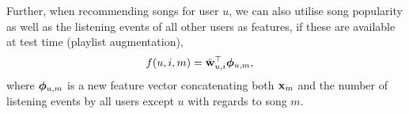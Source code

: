 Further, when recommending songs for user $u$, we can also utilise song popularity as well as the listening events of all other users as features,
if these are available at test time (\eg playlist augmentation), \ie
\begin{equation*}
\begin{aligned}
f(u, i, m) &= \bar{\mathbf{w}}_{u,i}^\top \bm{\phi}_{u,m},
\end{aligned}
\end{equation*}
where $\bm{\phi}_{u,m}$ is a new feature vector concatenating both $\mathbf{x}_m$ 
and the number of listening events by all users except $u$ with regards to song $m$.
